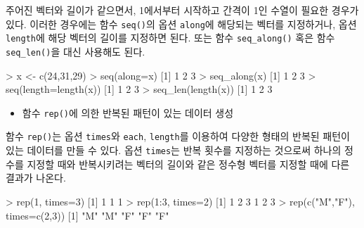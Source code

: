 \documentclass[
]{book}
\newenvironment{Shaded}{\begin{snugshade}}{\end{snugshade}}
\newcommand{\AttributeTok}[1]{\textcolor[rgb]{0.77,0.63,0.00}{#1}}
\newcommand{\DecValTok}[1]{\textcolor[rgb]{0.00,0.00,0.81}{#1}}
\newcommand{\FunctionTok}[1]{\textcolor[rgb]{0.00,0.00,0.00}{#1}}
\newcommand{\NormalTok}[1]{#1}
\newcommand{\OtherTok}[1]{\textcolor[rgb]{0.56,0.35,0.01}{#1}}
\newcommand{\SpecialCharTok}[1]{\textcolor[rgb]{0.00,0.00,0.00}{#1}}
\newcommand{\StringTok}[1]{\textcolor[rgb]{0.31,0.60,0.02}{#1}}
\providecommand{\tightlist}{%
  \setlength{\itemsep}{0pt}\setlength{\parskip}{0pt}}
\begin{document}
주어진 벡터와 길이가 같으면서, 1에서부터 시작하고 간격이 1인 수열이 필요한 경우가 있다. 이러한 경우에는 함수 \texttt{seq()}의 옵션 \texttt{along}에 해당되는 벡터를 지정하거나, 옵션 \texttt{length}에 해당 벡터의 길이를 지정하면 된다. 또는 함수 \texttt{seq\_along()} 혹은 함수 \texttt{seq\_len()}을 대신 사용해도 된다.

\begin{Shaded}
\begin{Highlighting}[]
\SpecialCharTok{\textgreater{}}\NormalTok{ x }\OtherTok{\textless{}{-}} \FunctionTok{c}\NormalTok{(}\DecValTok{24}\NormalTok{,}\DecValTok{31}\NormalTok{,}\DecValTok{29}\NormalTok{)}
\SpecialCharTok{\textgreater{}} \FunctionTok{seq}\NormalTok{(}\AttributeTok{along=}\NormalTok{x)}
\NormalTok{[}\DecValTok{1}\NormalTok{] }\DecValTok{1} \DecValTok{2} \DecValTok{3}
\SpecialCharTok{\textgreater{}} \FunctionTok{seq\_along}\NormalTok{(x)}
\NormalTok{[}\DecValTok{1}\NormalTok{] }\DecValTok{1} \DecValTok{2} \DecValTok{3}
\SpecialCharTok{\textgreater{}} \FunctionTok{seq}\NormalTok{(}\AttributeTok{length=}\FunctionTok{length}\NormalTok{(x))}
\NormalTok{[}\DecValTok{1}\NormalTok{] }\DecValTok{1} \DecValTok{2} \DecValTok{3}
\SpecialCharTok{\textgreater{}} \FunctionTok{seq\_len}\NormalTok{(}\FunctionTok{length}\NormalTok{(x))}
\NormalTok{[}\DecValTok{1}\NormalTok{] }\DecValTok{1} \DecValTok{2} \DecValTok{3}
\end{Highlighting}
\end{Shaded}

\begin{itemize}
\tightlist
\item
  함수 \texttt{rep()}에 의한 반복된 패턴이 있는 데이터 생성
\end{itemize}

함수 \texttt{rep()}는 옵션 \texttt{times}와 \texttt{each}, \texttt{length}를 이용하여 다양한 형태의 반복된 패턴이 있는 데이터를 만들 수 있다. 옵션 \texttt{times}는 반복 횟수를 지정하는 것으로써 하나의 정수를 지정할 때와 반복시키려는 벡터의 길이와 같은 정수형 벡터를 지정할 때에 다른 결과가 나온다.

\begin{Shaded}
\begin{Highlighting}[]
\SpecialCharTok{\textgreater{}} \FunctionTok{rep}\NormalTok{(}\DecValTok{1}\NormalTok{, }\AttributeTok{times=}\DecValTok{3}\NormalTok{)     }
\NormalTok{[}\DecValTok{1}\NormalTok{] }\DecValTok{1} \DecValTok{1} \DecValTok{1}
\SpecialCharTok{\textgreater{}} \FunctionTok{rep}\NormalTok{(}\DecValTok{1}\SpecialCharTok{:}\DecValTok{3}\NormalTok{, }\AttributeTok{times=}\DecValTok{2}\NormalTok{)}
\NormalTok{[}\DecValTok{1}\NormalTok{] }\DecValTok{1} \DecValTok{2} \DecValTok{3} \DecValTok{1} \DecValTok{2} \DecValTok{3}
\SpecialCharTok{\textgreater{}} \FunctionTok{rep}\NormalTok{(}\FunctionTok{c}\NormalTok{(}\StringTok{"M"}\NormalTok{,}\StringTok{"F"}\NormalTok{), }\AttributeTok{times=}\FunctionTok{c}\NormalTok{(}\DecValTok{2}\NormalTok{,}\DecValTok{3}\NormalTok{))}
\NormalTok{[}\DecValTok{1}\NormalTok{] }\StringTok{"M"} \StringTok{"M"} \StringTok{"F"} \StringTok{"F"} \StringTok{"F"}
\end{Highlighting}
\end{Shaded}
\end{document}
